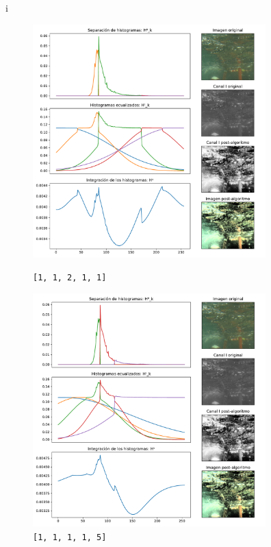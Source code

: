 i\begin{figure}[H]
\begin{minipage}[c]{0.48\linewidth}
  \includegraphics[height=9cm]{imgs/1908iv-11211.pdf}
  \caption{\texttt{[1, 1, 2, 1, 1]}}
\end{minipage}
\hfill
\begin{minipage}[c]{0.48\linewidth}
  \includegraphics[height=9cm]{imgs/1908iv-11115.pdf}
  \caption{\texttt{[1, 1, 1, 1, 5]}}
\end{minipage}%
\end{figure}
